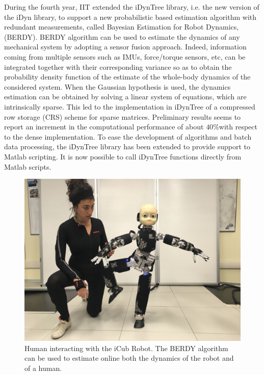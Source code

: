 During the fourth year, IIT extended the iDynTree library, i.e. the new
version of the iDyn library, to support a new probabilistic based estimation
algorithm with redundant measurements, called Bayesian Estimation for Robot
Dynamics, (BERDY).  BERDY algorithm can be used to estimate the dynamics of
any mechanical system by adopting a sensor fusion approach.  Indeed,
information coming from multiple sensors such as IMUs, force/torque sensors,
etc, can be integrated together with their corresponding variance so as to
obtain the probability density function of the estimate of the whole-body
dynamics of the considered system.  When the Gaussian hypothesis is used, the
dynamics estimation can be obtained by solving a linear system of equations,
which are intrinsically sparse.  This led to the implementation in iDynTree of
a compressed row storage (CRS) scheme for sparse matrices.  Preliminary
results seems to report an increment in the computational performance of about
$40\%$with respect to the dense implementation.  To ease the development of
algorithms and batch data processing, the iDynTree library has been extended
to provide support to Matlab scripting.  It is now possible to call iDynTree
functions directly from Matlab scripts.
%
\begin{figure}[h]
  \centering
    \includegraphics[width=.9\textwidth]{images/suit.jpg}
  \caption{Human interacting with the iCub Robot. The BERDY algorithm can be used to estimate online both the dynamics of the robot and of a human.}
  \label{fig:images_suit}
\end{figure}
%


